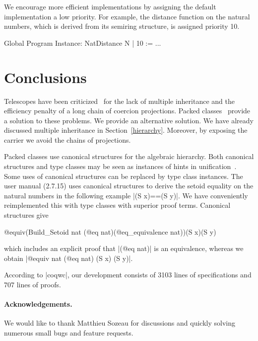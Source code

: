 \documentclass[a4paper,10pt]{llncs}
\begin{document}
We encourage more efficient implementations by assigning the default implementation a
low priority. For example, the distance function on the natural numbers, which is derived from its
semiring structure, is assigned priority 10.
\begin{code}
  Global Program Instance: NatDistance N | 10 := ...
\end{code}
\vspace*{-5ex}
\section{Conclusions}
Telescopes have been criticized~\cite{Packed} for the lack of multiple inheritance and
the efficiency penalty of a long chain of coercion projections. Packed classes~\cite{Packed} provide
a solution to these problems. We provide an alternative solution. We have already
discussed multiple inheritance in Section~\ref{hierarchy}. Moreover, by exposing the
carrier we avoid the chains of projections.

Packed classes use canonical structures for the algebraic hierarchy. Both canonical structures and
type classes may be seen as instances of hints in unification~\cite{Hints}. Some uses of canonical
structures can be replaced by type class instances. The user manual (2.7.15) uses canonical
structures to derive the setoid equality on the natural
numbers in the following example |(S x)==(S y)|. We have conveniently reimplemented this with
type classes with superior proof terms. Canonical structures give 
\begin{code}
@equiv(Build_Setoid nat (@eq nat)(@eq_equivalence nat))(S x)(S y)
\end{code}

which includes an explicit proof that |(@eq nat)| is an equivalence,
whereas we obtain |@equiv nat (@eq nat) (S x) (S y)|.

According to |coqwc|, our development consists of 3103 lines of specifications and 707 lines of
proofs. %

\paragraph{Acknowledgements.}
We would like to thank Matthieu Sozeau for discussions and quickly solving numerous small bugs and
feature requests. %


\end{document}
